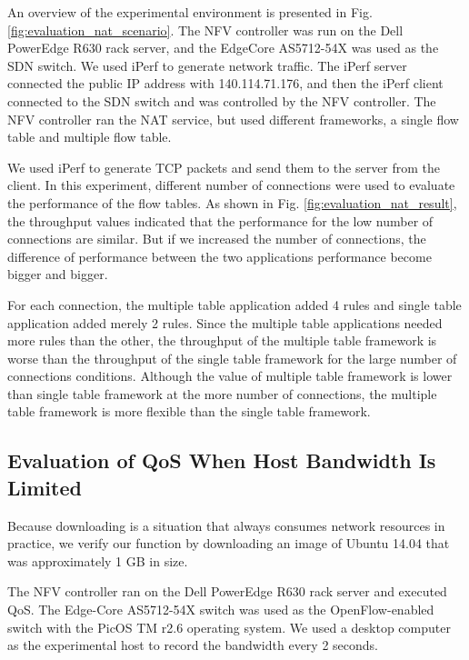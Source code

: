 \documentclass[conference]{IEEEtran}
\begin{document}
An overview of the experimental environment is presented in Fig. \ref{fig:evaluation_nat_scenario}. The NFV controller was run on the Dell PowerEdge R630 rack server, and the EdgeCore AS5712-54X \cite{edge-core-switch} was used as the SDN switch.
We used iPerf \cite{iperf} to generate network traffic. The iPerf server connected the public IP address with 140.114.71.176, and then the iPerf client connected to the SDN switch and was controlled by the NFV controller.
The NFV controller ran the NAT service, but used different frameworks, a single flow table and multiple flow table.

We used iPerf to generate TCP packets and send them to the server from the client.
In this experiment, different number of connections were used to evaluate the performance of the flow tables.
As shown in Fig. \ref{fig:evaluation_nat_result}, the throughput values indicated that the performance for the low number of connections are similar.
But if we increased the number of connections, the difference of performance between the two applications performance become bigger and bigger.

For each connection, the multiple table application added 4 rules and single table application added merely 2 rules. Since the multiple table applications needed more rules than the other, the throughput of the multiple table framework is worse than the throughput of the single table framework for the large number of connections conditions.
Although the value of multiple table framework is lower than single table framework at the more number of connections, the multiple table framework is more flexible than the single table framework.



\subsection{Evaluation of QoS When Host Bandwidth Is Limited}

Because downloading is a situation that always consumes network resources in practice,
we verify our function by downloading an image of Ubuntu 14.04 that was approximately 1 GB in size.

The NFV controller ran on the Dell PowerEdge R630 rack server and executed QoS.
The Edge-Core AS5712-54X \cite{edge-core-switch} switch was used as the OpenFlow-enabled switch with the PicOS TM r2.6 operating system.
We used a desktop computer as the experimental host to record the bandwidth every 2 seconds.
\end{document}
